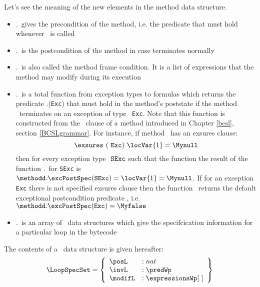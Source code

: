 Let's see the meaning of the new elements in the method data structure.
\begin{itemize}
     \item \methodd.\pre \ gives the precondition of the method, i.e. the predicate that must hold
           whenever \methodd \  is called
     \item \methodd.\normalPost \ is the postcondition of the method in case \methodd terminates normally  
     
     \item \methodd.\modif \ is also called the method frame condition. It is a list of expressions that the method
            may modify during its execution    
     
     \item \methodd.\excPostSpec \ is a total function from exception types to formulas which returns the predicate
           \methodd.\excPostSpec(\texttt{Exc})  that must hold in the method's poststate 
	   if the method \methodd \ terminates on an exception of type \mbox{ \rm \texttt{Exc}}. 
	   Note that this function is constructed from the \exsures \ clause of a method introduced in  Chapter \ref{bcsl},
	   section \ref{BCSLgrammar}. For instance, if method \methodd \ has an exsures clause:
	   $$ \exsures \  ( \mbox{ \rm \texttt{Exc}}) \ \locVar{1} = \Mynull $$
	   then for every exception type $\mbox{ \rm \texttt{SExc}} $ such that 
	   the function  the result of the function \methodd.\excPostSpec \  for  \texttt{SExc} 
           is $\methodd.\excPostSpec(\texttt{SExc} ) = \locVar{1} = \Mynull$. If for an exception \texttt{Exc} there is not specified exsures
	   clause then the function \excPostSpec \ returns the default exceptional postcondition predicate \Myfalse, i.e.
	   $\methodd.\excPostSpec(\texttt{Exc} ) = \Myfalse$
     \item \methodd.\loopSpecTable \ is an array of \LoopSpecSet \ data structures which give the specifcication information 
           for a particular loop in the bytecode         
\end{itemize}

 
The contents of a \LoopSpecSet \ data structure is given hereafter:
$$ \begin{array}{l}
      \LoopSpecSet = \left\{\begin{array}{ll}  
                                       \posL   & : nat \\
                                       \invL   & : \predWp \\                 
	                               \modifL   & :  \expressionsWp  \lbrack \ \rbrack  
                            \end{array}  \right\} 
     \end{array} $$ 


